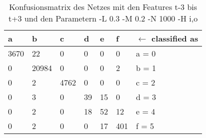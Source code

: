\begin{table}[p]
\begin{tabular}{llllll|l}
a & b & c & d & e & f & $\leftarrow$ classified as  \\
\hline
3670 & 22 & 0 & 0 & 0 & 0 & a = 0  \\
0 & 20984 & 0 & 0 & 0 & 2 & b = 1  \\
0 & 2 & 4762 & 0 & 0 & 0 & c = 2  \\
0 & 3 & 0 & 39 & 15 & 0 & d = 3  \\
0 & 2 & 0 & 18 & 52 & 12 & e = 4  \\
0 & 2 & 0 & 0 & 17 & 401 & f = 5  \\
\end{tabular}
\caption[Konfusionsmatrix]{Konfusionsmatrix des Netzes mit den Features t-3 bis t+3 und den Parametern -L 0.3 -M 0.2 -N 1000 -H i,o}
\label{EvalConf}
\end{table}

